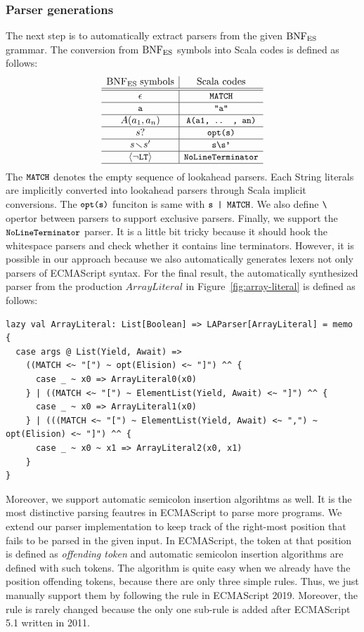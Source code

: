 \subsubsection{Parser generations}\label{sec:convert-bnfes}
The next step is to automatically extract parsers from the given \( \text{BNF}_{\text{ES}} \) grammar.
The conversion from \( \text{BNF}_{\text{ES}} \) symbols into Scala codes is defined as follows:
\[
  \begin{array}{c|c}
    \text{BNF}_{\text{ES}} \; \text{symbols} & \text{Scala codes}\\\hline\hline
    \epsilon & \texttt{\small MATCH}\\\hline
    \texttt{\small a} & \texttt{\small"a"}\\\hline
    A(a_1, a_n) & \texttt{\small A(a1, .. , an)}\\\hline
    s? & \texttt{\small opt(s)}\\\hline
    s \!\smallsetminus\! s' & \texttt{\small s\textbackslash s'}\\\hline
    \left<\neg\texttt{\small LT}\right> & \texttt{\small NoLineTerminator}\\\hline
  \end{array}
\]
The \( \texttt{\small MATCH} \) denotes the empty sequence of lookahead parsers.
Each String literals are implicitly converted into lookahead parsers
through Scala implicit conversions. The \( \texttt{\small opt(s)} \) funciton
is same with \( \texttt{\small s | MATCH} \). We also define \( \texttt{\small\textbackslash} \)
opertor between parsers to support exclusive parsers.
Finally, we support the \( \texttt{\small NoLineTerminator} \) parser.
It is a little bit tricky because it should hook the whitespace parsers
and check whether it contains line terminators.
However, it is possible in our approach because
we also automatically generates lexers not only parsers of ECMAScript syntax.
For the final result, the automatically synthesized parser from the
production \( ArrayLiteral \) in Figure~\ref{fig:array-literal} is defined as follows:
\begin{lstlisting}[style=myScalastyle]
lazy val ArrayLiteral: List[Boolean] => LAParser[ArrayLiteral] = memo {
  case args @ List(Yield, Await) =>
    ((MATCH <~ "[") ~ opt(Elision) <~ "]") ^^ {
      case _ ~ x0 => ArrayLiteral0(x0)
    } | ((MATCH <~ "[") ~ ElementList(Yield, Await) <~ "]") ^^ {
      case _ ~ x0 => ArrayLiteral1(x0)
    } | (((MATCH <~ "[") ~ ElementList(Yield, Await) <~ ",") ~ opt(Elision) <~ "]") ^^ {
      case _ ~ x0 ~ x1 => ArrayLiteral2(x0, x1)
    }
}
\end{lstlisting}

Moreover, we support automatic semicolon insertion algorihtms as well.
It is the most distinctive parsing feautres in ECMAScript to parse more programs.
We extend our parser implementation to keep track of the right-most position
that fails to be parsed in the given input. In ECMAScript, the token at that
position is defined as \textit{offending token} and automatic semicolon insertion
algorithms are defined with such tokens. The algorithm is quite easy when we
already have the position offending tokens, because there are only three simple
rules. Thus, we just manually support them by following the rule in ECMAScript 2019.
Moreover, the rule is rarely changed because the only one sub-rule is added
after ECMAScript 5.1 written in 2011.
